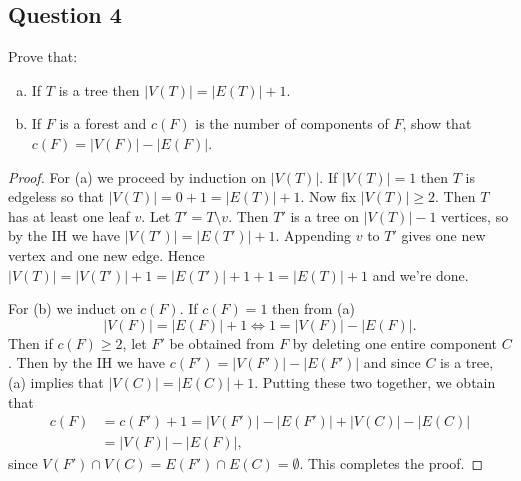 \subsection{Question 4} Prove that:
\begin{enumerate}[(a), leftmargin=1cm]
	\item If \( T \) is a tree then \( |V(T)| = |E(T)| + 1 \).
	\item If \( F \) is a forest and \( c(F) \) is the number of components of \( F \), show that \( c(F) = |V(F)| - |E(F)| \).
\end{enumerate}
\begin{proof}
For (a) we proceed by induction on \( |V(T)| \). If \( |V(T)| = 1 \) then \( T \) is edgeless so that \( |V(T)| = 0 + 1 = |E(T)| + 1 \). Now fix \( |V(T)| \geq 2 \).  Then \( T \) has at least one leaf \( v \). Let \( T' = T \setminus v \). Then \( T' \) is a tree on \( |V(T)| - 1 \) vertices, so by the IH we have \( |V(T')| = |E(T')| + 1 \). Appending \( v \) to \( T' \) gives one new vertex and one new edge. Hence \( |V(T)| = |V(T')| + 1 = |E(T')| + 1 + 1 = |E(T)| + 1 \) and we're done.

For (b) we induct on \( c(F) \). If \( c(F) = 1 \) then from (a) \[|V(F)| = |E(F)| + 1 \Leftrightarrow   1 = |V(F)| - |E(F)|. \] Then if \( c(F) \geq 2 \), let \( F' \) be obtained from \( F \) by deleting one entire component \( C \). Then by the IH we have \( c(F') = |V(F')| - |E(F')| \) and since \( C \) is a tree, (a) implies that \( |V(C)| = |E(C)| + 1  \). Putting these two together, we obtain that
\begin{align*}
	c(F) &= c(F') + 1 = |V(F')| - |E(F')| + |V(C)| - |E(C)| \\
	     &= |V(F)| - |E(F)|, 
\end{align*}
since \( V(F') \cap V(C) = E(F') \cap E(C) = \emptyset  \). This completes the proof.
\end{proof}
